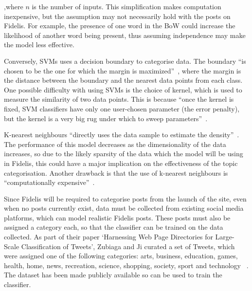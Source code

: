 \noindent ,where $n$ is the number of inputs. This simplification makes computation inexpensive, but the assumption may not necessarily hold with the posts on Fidelis. For example, the presence of one word in the BoW could increase the likelihood of another word being present, thus assuming independence may make the model less effective.

Conversely, SVMs uses a decision boundary to categorise data. The boundary ``is chosen to be the one for which the margin is maximized''~\cite{Bishop:SVM}, where the margin is the distance between the boundary and the nearest data points from each class. One possible difficulty with using SVMs is the choice of kernel, which is used to measure the similarity of two data points. This is because ``once the kernel is fixed, SVM classifiers have only one user-chosen parameter (the error penalty), but the kernel is a very big rug under which to sweep parameters''~\cite{Burges:SVM}.

K-nearest neighbours ``directly uses the data sample to estimate the density''~\cite{Zaki:KNN}. The performance of this model decreases as the dimensionality of the data increases, so due to the likely sparsity of the data which the model will be using in Fidelis, this could have a major implication on the effectiveness of the topic categorisation. Another drawback is that the use of k-nearest neighbours is ``computationally expensive''~\cite{Kuncheva:KNN}.

Since Fidelis will be required to categorise posts from the launch of the site, even when no posts currently exist, data must be collected from existing social media platforms, which can model realistic Fidelis posts. These posts must also be assigned a category each, so that the classifier can be trained on the data collected. As part of their paper `Harnessing Web Page Directories for Large-Scale Classification of Tweets', Zubiaga and Ji curated a set of Tweets, which were assigned one of the following categories: arts, business, education, games, health, home, news, recreation, science, shopping, society, sport and technology ~\cite{Zubiaga:Tweets}. The dataset has been made publicly available so can be used to train the classifier.

